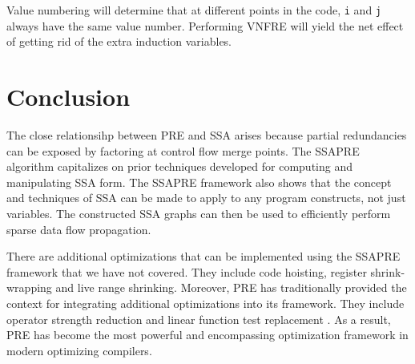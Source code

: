 Value numbering will determine that at different points in the code, {\tt i}
and {\tt j} always have the same value number.  Performing VNFRE will yield the
net effect of getting rid of the extra induction variables.

\section{Conclusion}

The close relationsihp between PRE and SSA arises because 
partial redundancies can be exposed by factoring at control flow merge points.
The SSAPRE algorithm capitalizes on prior techniques developed for computing 
and manipulating SSA form.  The SSAPRE framework also shows that the 
concept and techniques of SSA can be made to apply to any program constructs, 
not just variables.  The constructed SSA graphs can then be used to 
efficiently perform sparse data flow propagation.

There are additional optimizations that can be implemented using the SSAPRE
framework that we have not covered.  They include code hoisting, register 
shrink-wrap\-ping \cite{Chow88} and live range shrinking.  Moreover, PRE has 
traditionally provided the context for integrating additional optimizations 
into its framework.  They include operator strength reduction \cite{Knoop93} 
and linear function test replacement \cite{Kennedy98}.  As a result, PRE 
has become the most powerful and encompassing optimization framework in modern 
optimizing compilers.
